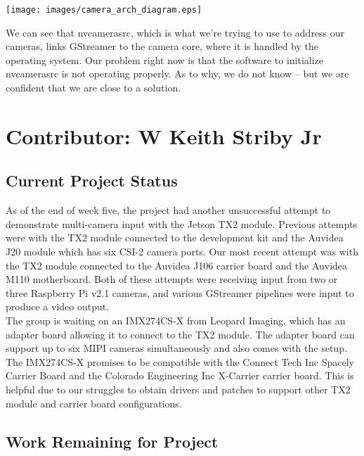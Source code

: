 \documentclass[letterpaper,10pt,serif,draftclsnofoot,onecolumn,compsoc,titlepage]{IEEEtran}
\begin{document}
\texttt{[image: images/camera\_arch\_diagram.eps]}


We can see that nvcamerasrc, which is what we're trying to use to address our cameras, links GStreamer to the camera core, where it is handled by the operating system. Our problem right now is that the software to initialize nvcamerasrc is not operating properly. As to why, we do not know -- but we are confident that we are close to a solution.


\section{Contributor: W Keith Striby Jr}

\subsection{Current Project Status}

As of the end of week five, the project had another unsuccessful attempt to demonstrate 
multi-camera input with the Jetson TX2 module. Previous attempts were with the TX2 module
connected to the development kit and the Auvidea J20 module which has six CSI-2 camera 
ports. Our most recent attempt was with the TX2 module connected to the Auvidea J106 
carrier board and the Auvidea M110 motherboard. Both of these attempts were receiving 
input from two or three Raspberry Pi v2.1 cameras, and various GStreamer 
pipelines were input to produce a video output. \\

The group is waiting on an IMX274CS-X from Leopard Imaging, which has an 
adapter board allowing it to connect to the TX2 module. The adapter board can support 
up to six MIPI cameras simultaneously and also comes with the setup. The IMX274CS-X 
promises to be compatible with the Connect Tech Inc Spacely Carrier
Board and the Colorado Engineering Inc X-Carrier carrier board. This is helpful due to 
our struggles to obtain drivers and patches to support other TX2 module and carrier 
board configurations. \\


\subsection{Work Remaining for Project}
\end{document}
